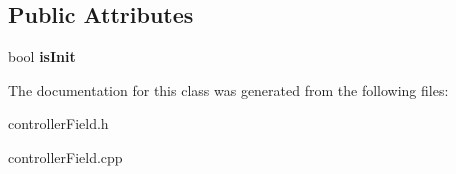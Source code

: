 \subsection*{Public Attributes}
\begin{DoxyCompactItemize}
\item 
\hypertarget{classcontrollerField_abf27d56b6d84faf7f0c3eaf940e14085}{bool {\bfseries is\+Init}}\label{classcontrollerField_abf27d56b6d84faf7f0c3eaf940e14085}

\end{DoxyCompactItemize}


The documentation for this class was generated from the following files\+:\begin{DoxyCompactItemize}
\item 
controller\+Field.\+h\item 
controller\+Field.\+cpp\end{DoxyCompactItemize}

